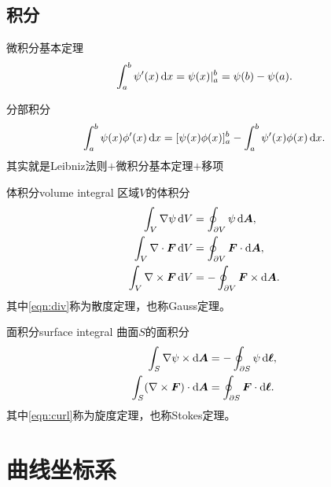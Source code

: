 \subsection{积分}
\label{ssec:integral calculus}

\begin{compactitem}
	\item 微积分基本定理
	\begin{equation}
        \int_a^b\psi'(x)\mathop{}\!\mathrm{d} x = {\psi(x)}\rvert_a^b = \psi(b) - \psi(a).
    \end{equation}
    \item 分部积分
    \begin{equation}
        \int_a^b\psi(x)\phi'(x)\mathop{}\!\mathrm{d} x = [\psi(x)\phi(x)]_a^b - \int_a^b\psi'(x)\phi(x)\mathop{}\!\mathrm{d} x.
    \end{equation}
    其实就是Leibniz法则$+$微积分基本定理$+$移项
\end{compactitem}

\begin{theorem}
    {体积分}{volume integral}
    区域$V$的体积分
    \begin{align}
        \int_V\nabla\psi\mathop{}\!\mathrm{d} V &= \oint_{\partial V}\psi\mathop{}\!\mathrm{d}\bm A,\\
        \label{eqn:div}
        \int_V\nabla\cdot\bm F\mathop{}\!\mathrm{d} V &= \oint_{\partial V}\bm F \cdot \mathop{}\!\mathrm{d}\bm A,\\
        \int_V\nabla\times\bm F\mathop{}\!\mathrm{d} V &= -\oint_{\partial V}\bm F \times \mathop{}\!\mathrm{d}\bm A.
    \end{align}
    其中\eqref{eqn:div}称为散度定理，也称Gauss定理。
\end{theorem}

\begin{theorem}
    {面积分}{surface integral}
    曲面$S$的面积分
    \begin{align}
        \int_S\nabla\psi \times \mathop{}\!\mathrm{d}\bm A &= -\oint_{\partial S}\psi\mathop{}\!\mathrm{d}\bm\ell,\\
        \label{eqn:curl}
        \int_S(\nabla\times\bm F) \cdot \mathop{}\!\mathrm{d}\bm A &= \oint_{\partial S}\bm F \cdot \mathop{}\!\mathrm{d}\bm\ell.
    \end{align}
    其中\eqref{eqn:curl}称为旋度定理，也称Stokes定理。
\end{theorem}



\section{曲线坐标系}
\label{sec:curvilinear coordinates}


